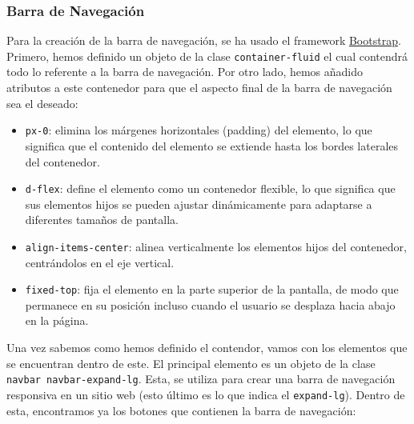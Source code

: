 \documentclass{article}
\begin{document}
\subsubsection{Barra de Navegación}

\noindent Para la creación de la barra de navegación, se ha usado el framework \href{https://getbootstrap.com/}{Bootstrap}. Primero, hemos definido un objeto de la clase \texttt{container-fluid} el cual contendrá todo lo referente a la barra de navegación. Por otro lado, hemos añadido atributos a este contenedor para que el aspecto final de la barra de navegación sea el deseado:
\begin{itemize}
    \item \texttt{px-0}: elimina los márgenes horizontales (padding) del elemento, lo que significa que el contenido del elemento se extiende hasta los bordes laterales del contenedor.
    \item \texttt{d-flex}: define el elemento como un contenedor flexible, lo que significa que sus elementos hijos se pueden ajustar dinámicamente para adaptarse a diferentes tamaños de pantalla.
    \item \texttt{align-items-center}: alinea verticalmente los elementos hijos del contenedor, centrándolos en el eje vertical.
    \item \texttt{fixed-top}: fija el elemento en la parte superior de la pantalla, de modo que permanece en su posición incluso cuando el usuario se desplaza hacia abajo en la página.
\end{itemize}
Una vez sabemos como hemos definido el contendor, vamos con los elementos que se encuentran dentro de este. El principal elemento es un objeto de la clase \texttt{navbar navbar-expand-lg}. Esta, se utiliza para crear una barra de navegación responsiva en un sitio web (esto último es lo que indica el \texttt{expand-lg}). Dentro de esta, encontramos ya los botones que contienen la barra de navegación:
\end{document}
